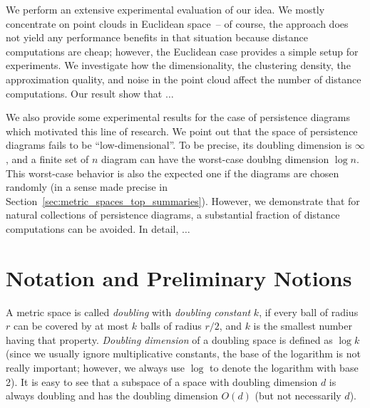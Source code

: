 \documentclass[a4paper,USenglish]{socg-lipics-v2018}
\begin{document}
We perform an extensive experimental evaluation of our idea.
We mostly concentrate on point clouds in Euclidean space~--
of course, the approach does not yield any performance benefits in that
situation because distance computations are cheap; however, the Euclidean
case provides a simple setup for experiments.
We investigate how the dimensionality, the clustering density, 
the approximation quality, and noise 
in the point cloud affect the number of distance computations.
Our result show that $\ldots$

We also provide some experimental results for the case of persistence diagrams
which motivated this line of research. We point out that the space of
persistence diagrams fails to be ``low-dimensional''. To be precise,
its doubling dimension is $\infty$, and a finite set of $n$ diagram
can have the worst-case doublng dimension $\log n$. This worst-case
behavior is also the expected one if the diagrams are chosen randomly
(in a sense made precise in Section~\ref{sec:metric_spaces_top_summaries}). 
However, we demonstrate that
for natural collections of persistence diagrams, a substantial fraction
of distance computations can be avoided. In detail, $\ldots$



\section{Notation and Preliminary Notions}



A metric space is called \textit{doubling} with \textit{doubling constant} $k$,
if every ball of radius $r$ can be covered by at most $k$ balls of radius $r/2$,
and $k$ is the smallest number having that property.
\textit{Doubling dimension} of a doubling space is defined as $\log k$
(since we usually ignore multiplicative constants, the base of the logarithm is not really important; however,
we always use $\log$ to denote the logarithm with base 2).
It is easy to see that a subspace of a space with doubling dimension $d$ 
is always doubling and has the doubling dimension $O(d)$ (but not necessarily $d$).
\end{document}
